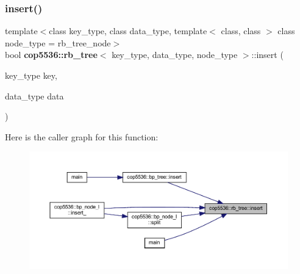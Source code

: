 \mbox{\label{classcop5536_1_1rb__tree_af6623f271ebac00dd2b9dc525a21f04b}} 
\subsubsection{insert()}
{\footnotesize\ttfamily template$<$class key\+\_\+type, class data\+\_\+type, template$<$ class, class $>$ class node\+\_\+type = rb\+\_\+tree\+\_\+node$>$ \\
bool \textbf{ cop5536\+::rb\+\_\+tree}$<$ key\+\_\+type, data\+\_\+type, node\+\_\+type $>$\+::insert (\begin{DoxyParamCaption}\item[{key\+\_\+type}]{key,  }\item[{data\+\_\+type}]{data }\end{DoxyParamCaption})\hspace{0.3cm}{\ttfamily [inline]}}

Here is the caller graph for this function\+:
\nopagebreak
\begin{figure}[H]
\begin{center}
\leavevmode
\includegraphics[width=350pt]{classcop5536_1_1rb__tree_af6623f271ebac00dd2b9dc525a21f04b_icgraph}
\end{center}
\end{figure}
\mbox{\label{classcop5536_1_1rb__tree_a7a5907ab99800b3fdf73fdaa4d92e57a}} 

